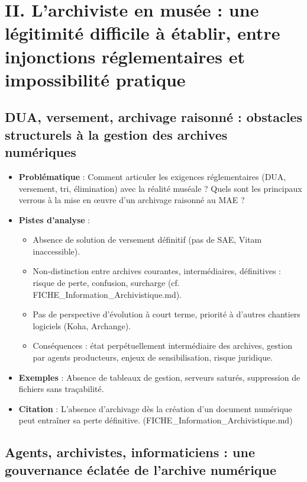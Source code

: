 \section{II. L’archiviste en musée : une légitimité difficile à établir, entre injonctions réglementaires et impossibilité pratique}

\subsection{DUA, versement, archivage raisonné : obstacles structurels à la gestion des archives numériques}

\begin{itemize}
	\item \textbf{Problématique} : Comment articuler les exigences réglementaires (DUA, versement, tri, élimination) avec la réalité muséale ? Quels sont les principaux verrous à la mise en œuvre d’un archivage raisonné au MAE ?
	\item \textbf{Pistes d’analyse} :
	\begin{itemize}
		\item Absence de solution de versement définitif (pas de SAE, Vitam inaccessible).
		\item Non-distinction entre archives courantes, intermédiaires, définitives : risque de perte, confusion, surcharge (cf. FICHE\_Information\_Archivistique.md).
		\item Pas de perspective d’évolution à court terme, priorité à d’autres chantiers logiciels (Koha, Archange).
		\item Conséquences : état perpétuellement intermédiaire des archives, gestion par agents producteurs, enjeux de sensibilisation, risque juridique.
	\end{itemize}
	\item \textbf{Exemples} : Absence de tableaux de gestion, serveurs saturés, suppression de fichiers sans traçabilité.
	\item \textbf{Citation} : \og L’absence d’archivage dès la création d’un document numérique peut entraîner sa perte définitive. \fg (FICHE\_Information\_Archivistique.md)
\end{itemize}

\subsection{Agents, archivistes, informaticiens : une gouvernance éclatée de l’archive numérique}

